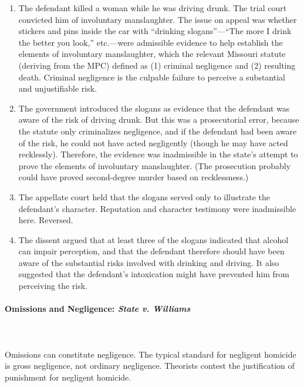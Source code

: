 \begin{enumerate}
    \item The defendant killed a woman while he was driving drunk. The trial 
    court convicted him of involuntary manslaughter. The issue on appeal was 
    whether stickers and pins inside the car with ``drinking slogans''---``The 
    more I drink the better you look,'' etc.---were admissible evidence to help 
    establish the elements of involuntary manslaughter, which the relevant 
    Missouri statute (deriving from the MPC) defined as (1) criminal 
    negligence and (2) resulting death. Criminal negligence is the culpable 
    failure to perceive a substantial and unjustifiable risk.
    \item The government introduced the slogans as evidence that the defendant 
    was aware of the risk of driving drunk. But this was a prosecutorial 
    error, because the statute only criminalizes negligence, and if the 
    defendant had been aware of the risk, he could not have acted negligently 
    (though he may have acted recklessly). Therefore, the evidence was 
    inadmissible in the state's attempt to prove the elements of involuntary 
    manslaughter. (The prosecution probably could have proved second-degree 
    murder based on recklessness.)
    \item The appellate court held that the slogans served only to illustrate 
    the defendant's character. Reputation and character testimony were 
    inadmissible here. Reversed.
    \item The dissent argued that at least three of the slogans indicated that 
    alcohol can impair perception, and that the defendant therefore should 
    have been aware of the substantial risks involved with drinking and 
    driving. It also suggested that the defendant's intoxication might have 
    prevented him from perceiving the risk.
\end{enumerate}

\paragraph{Omissions and Negligence: \emph{State v. Williams}}
~\\\\
Omissions can constitute negligence. The typical standard for negligent 
homicide is gross negligence, not ordinary negligence. Theorists contest 
the justification of punishment for negligent homicide.

